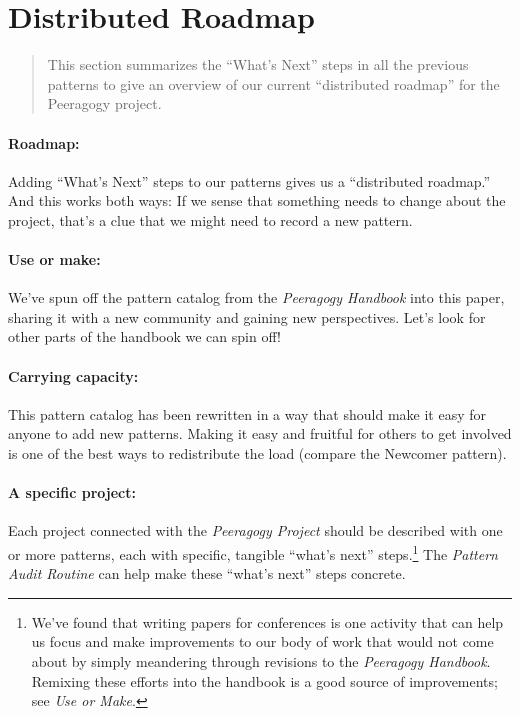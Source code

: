 \section{Distributed Roadmap}

\begin{quote}
This section summarizes the ``What's Next'' steps in all the previous
patterns to give an overview of our current ``distributed roadmap''
for the Peeragogy project.
\end{quote}

\paragraph{Roadmap:} Adding ``What's Next'' steps to our patterns gives us a ``distributed roadmap.''  And this works both ways:  
If we sense that something needs to change about the project, that's a
clue that we might need to record a new pattern.

\paragraph{Use or make:} 
We've spun off the pattern catalog from the \emph{Peeragogy Handbook} into this paper, sharing it with a new community and gaining new perspectives.  Let's look for other parts of the handbook we can spin off!

\paragraph{Carrying capacity:} This pattern catalog has been rewritten in a way that should make it
easy for anyone to add new patterns. Making it easy and fruitful for
others to get involved is one of the best ways to redistribute the load
(compare the Newcomer pattern).

\paragraph{A specific project:} 
 Each project connected with the \emph{Peeragogy Project} should be described with one or more patterns, each with specific, tangible ``what's next'' steps.\footnote{We've found that writing papers for conferences is one activity that can help us focus and make improvements to our body of work that would not come about by simply meandering through revisions to the \emph{Peeragogy Handbook}.  Remixing these efforts into the handbook is a good source of improvements; see \emph{Use or Make}.}  The \emph{Pattern Audit Routine} can help make these ``what's next'' steps concrete.

